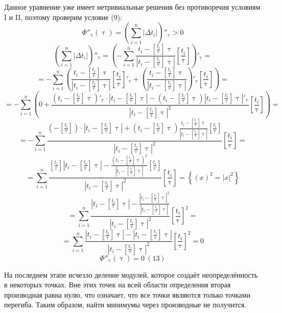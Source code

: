 \documentclass[12pt]{report}
\let\tau\uptau
\begin{document}
Данное уравнение уже имеет нетривиальные решения без противоречия условиям I и II, поэтому проверим условие (9):
$$\Phi''_\tau(\tau)=\left(\sum_{i=1}^n|\Delta t_i|\right)''_\tau>0$$
$$\left(\sum_{i=1}^n|\Delta t_i|\right)''_\tau=\left(-\sum_{i=1}^n\frac{t_i-\left[\frac{t_i}{\tau}\right]\tau}{|t_i-\left[\frac{t_i}{\tau}\right]\tau|}\left[\frac{t_i}{\tau}\right]\right)'_\tau=$$
$$=-\sum_{i=1}^n\left(\frac{t_i-\left[\frac{t_i}{\tau}\right]\tau}{|t_i-\left[\frac{t_i}{\tau}\right]\tau|}\left[\frac{t_i}{\tau}\right]'_\tau+\left(\frac{t_i-\left[\frac{t_i}{\tau}\right]\tau}{|t_i-\left[\frac{t_i}{\tau}\right]\tau|}\right)'_\tau\left[\frac{t_i}{\tau}\right]\right)=$$
$$=-\sum_{i=1}^n\left(0+\frac{(t_i-\left[\frac{t_i}{\tau}\right]\tau)'_\tau\cdot|t_i-\left[\frac{t_i}{\tau}\right]\tau|-(t_i-\left[\frac{t_i}{\tau}\right]\tau)|t_i-\left[\frac{t_i}{\tau}\right]\tau|'_\tau}{|t_i-\left[\frac{t_i}{\tau}\right]\tau|^2}\left[\frac{t_i}{\tau}\right]\right)=$$
$$=-\sum_{i=1}^n\frac{(-\left[\frac{t_i}{\tau}\right])\cdot|t_i-\left[\frac{t_i}{\tau}\right]\tau|+(t_i-\left[\frac{t_i}{\tau}\right]\tau)\frac{t_i-\left[\frac{t_i}{\tau}\right]\tau}{|t_i-\left[\frac{t_i}{\tau}\right]\tau|}\left[\frac{t_i}{\tau}\right]}{|t_i-\left[\frac{t_i}{\tau}\right]\tau|^2}\left[\frac{t_i}{\tau}\right]=$$
$$=\sum_{i=1}^n\frac{\left[\frac{t_i}{\tau}\right]|t_i-\left[\frac{t_i}{\tau}\right]\tau|-\frac{(t_i-\left[\frac{t_i}{\tau}\right]\tau)^2}{|t_i-\left[\frac{t_i}{\tau}\right]\tau|}\left[\frac{t_i}{\tau}\right]}{|t_i-\left[\frac{t_i}{\tau}\right]\tau|^2}\left[\frac{t_i}{\tau}\right]=\left\{(x)^2=|x|^2\right\}$$
$$=\sum_{i=1}^n\frac{|t_i-\left[\frac{t_i}{\tau}\right]\tau|-\frac{|t_i-\left[\frac{t_i}{\tau}\right]\tau|^2}{|t_i-\left[\frac{t_i}{\tau}\right]\tau|}}{|t_i-\left[\frac{t_i}{\tau}\right]\tau|^2}\left[\frac{t_i}{\tau}\right]^2=$$
$$=\sum_{i=1}^n\frac{|t_i-\left[\frac{t_i}{\tau}\right]\tau|-|t_i-\left[\frac{t_i}{\tau}\right]\tau|}{|t_i-\left[\frac{t_i}{\tau}\right]\tau|^2}\left[\frac{t_i}{\tau}\right]^2=0$$
$$\Phi''_\tau(\tau)=0\ (13)$$

На последнем этапе исчезло деление модулей, которое создаёт неопределённость в некоторых точках. Вне этих точек на всей области определения вторая производная равна нулю, что означает, что все точки являются только точками перегиба. Таким образом, найти минимумы через производные не получится.
\end{document}
